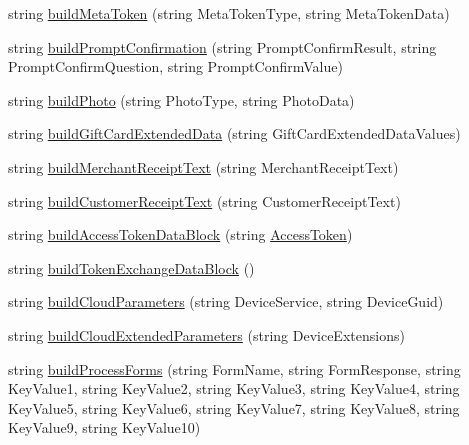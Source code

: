 \begin{DoxyCompactItemize}
\item 
string \mbox{\hyperlink{class_form_sim_1_1_t_c_p_handler_a8da4a9dcb24a7ccefd0dde4522ed38e1}{build\+Meta\+Token}} (string Meta\+Token\+Type, string Meta\+Token\+Data)
\item 
string \mbox{\hyperlink{class_form_sim_1_1_t_c_p_handler_a37aa7ecd052c79a26fdac447ea6a72d4}{build\+Prompt\+Confirmation}} (string Prompt\+Confirm\+Result, string Prompt\+Confirm\+Question, string Prompt\+Confirm\+Value)
\item 
string \mbox{\hyperlink{class_form_sim_1_1_t_c_p_handler_a82c62d64444135157cb28449b445bd52}{build\+Photo}} (string Photo\+Type, string Photo\+Data)
\item 
string \mbox{\hyperlink{class_form_sim_1_1_t_c_p_handler_a48261051c49953461df8f0f5f6a8f0bc}{build\+Gift\+Card\+Extended\+Data}} (string Gift\+Card\+Extended\+Data\+Values)
\item 
string \mbox{\hyperlink{class_form_sim_1_1_t_c_p_handler_a8151b0587c3e38221d36a7e1b104be99}{build\+Merchant\+Receipt\+Text}} (string Merchant\+Receipt\+Text)
\item 
string \mbox{\hyperlink{class_form_sim_1_1_t_c_p_handler_aaf2b9db4f07dc72731543e366ae57f11}{build\+Customer\+Receipt\+Text}} (string Customer\+Receipt\+Text)
\item 
string \mbox{\hyperlink{class_form_sim_1_1_t_c_p_handler_a7026c44fa7957b4a223982a9b5b51b6c}{build\+Access\+Token\+Data\+Block}} (string \mbox{\hyperlink{class_form_sim_1_1_generic_handler_ad47864be2c5790106a7538f640b2792f}{Access\+Token}})
\item 
string \mbox{\hyperlink{class_form_sim_1_1_t_c_p_handler_aa04c2b705de9418eb13e35e01e1b784b}{build\+Token\+Exchange\+Data\+Block}} ()
\item 
string \mbox{\hyperlink{class_form_sim_1_1_t_c_p_handler_a7800a9d1eff8e2f38f22a8e4aebfed72}{build\+Cloud\+Parameters}} (string Device\+Service, string Device\+Guid)
\item 
string \mbox{\hyperlink{class_form_sim_1_1_t_c_p_handler_aae852cd3817353f951a7473471a1b9de}{build\+Cloud\+Extended\+Parameters}} (string Device\+Extensions)
\item 
string \mbox{\hyperlink{class_form_sim_1_1_t_c_p_handler_ad2df13eccffc001256e4a0265ef274c6}{build\+Process\+Forms}} (string Form\+Name, string Form\+Response, string Key\+Value1, string Key\+Value2, string Key\+Value3, string Key\+Value4, string Key\+Value5, string Key\+Value6, string Key\+Value7, string Key\+Value8, string Key\+Value9, string Key\+Value10)
\item 

\end{DoxyCompactItemize}

